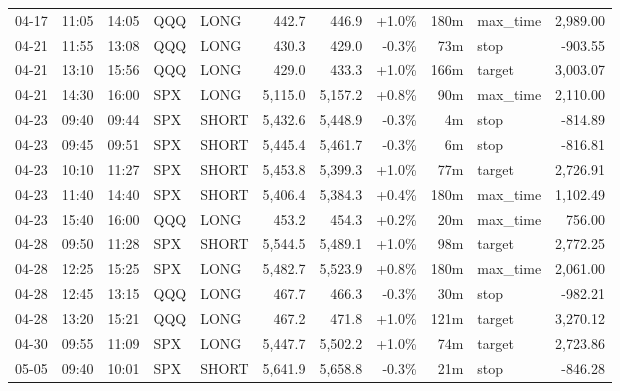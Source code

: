 \documentclass[11pt,a4paper,twoside]{article}
\begin{document}
\begin{center}
\begin{longtable}{>{\color{txtmain}}l l l l l r r r r >{\color{txtmain}}l r}
04-17 & 11:05 & 14:05 & QQQ & LONG & 442.7 & 446.9 & \textcolor{wingreen}{+1.0\%} & 180m & max\_time & \textcolor{wingreen}{2,989.00} \\
04-21 & 11:55 & 13:08 & QQQ & LONG & 430.3 & 429.0 & \textcolor{lossred}{-0.3\%} & 73m & stop & \textcolor{lossred}{-903.55} \\
04-21 & 13:10 & 15:56 & QQQ & LONG & 429.0 & 433.3 & \textcolor{wingreen}{+1.0\%} & 166m & target & \textcolor{wingreen}{3,003.07} \\
04-21 & 14:30 & 16:00 & SPX & LONG & 5,115.0 & 5,157.2 & \textcolor{wingreen}{+0.8\%} & 90m & max\_time & \textcolor{wingreen}{2,110.00} \\
04-23 & 09:40 & 09:44 & SPX & SHORT & 5,432.6 & 5,448.9 & \textcolor{lossred}{-0.3\%} & 4m & stop & \textcolor{lossred}{-814.89} \\
04-23 & 09:45 & 09:51 & SPX & SHORT & 5,445.4 & 5,461.7 & \textcolor{lossred}{-0.3\%} & 6m & stop & \textcolor{lossred}{-816.81} \\
04-23 & 10:10 & 11:27 & SPX & SHORT & 5,453.8 & 5,399.3 & \textcolor{wingreen}{+1.0\%} & 77m & target & \textcolor{wingreen}{2,726.91} \\
04-23 & 11:40 & 14:40 & SPX & SHORT & 5,406.4 & 5,384.3 & \textcolor{wingreen}{+0.4\%} & 180m & max\_time & \textcolor{wingreen}{1,102.49} \\
04-23 & 15:40 & 16:00 & QQQ & LONG & 453.2 & 454.3 & \textcolor{wingreen}{+0.2\%} & 20m & max\_time & \textcolor{wingreen}{756.00} \\
04-28 & 09:50 & 11:28 & SPX & SHORT & 5,544.5 & 5,489.1 & \textcolor{wingreen}{+1.0\%} & 98m & target & \textcolor{wingreen}{2,772.25} \\
04-28 & 12:25 & 15:25 & SPX & LONG & 5,482.7 & 5,523.9 & \textcolor{wingreen}{+0.8\%} & 180m & max\_time & \textcolor{wingreen}{2,061.00} \\
04-28 & 12:45 & 13:15 & QQQ & LONG & 467.7 & 466.3 & \textcolor{lossred}{-0.3\%} & 30m & stop & \textcolor{lossred}{-982.21} \\
04-28 & 13:20 & 15:21 & QQQ & LONG & 467.2 & 471.8 & \textcolor{wingreen}{+1.0\%} & 121m & target & \textcolor{wingreen}{3,270.12} \\
04-30 & 09:55 & 11:09 & SPX & LONG & 5,447.7 & 5,502.2 & \textcolor{wingreen}{+1.0\%} & 74m & target & \textcolor{wingreen}{2,723.86} \\
05-05 & 09:40 & 10:01 & SPX & SHORT & 5,641.9 & 5,658.8 & \textcolor{lossred}{-0.3\%} & 21m & stop & \textcolor{lossred}{-846.28} \\

\end{longtable}
\end{center}
\end{document}
